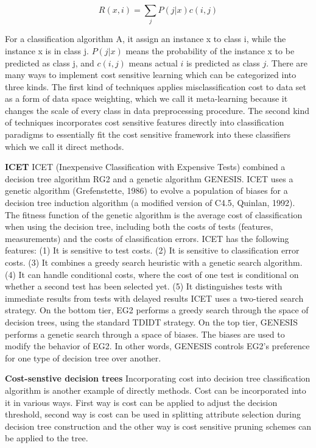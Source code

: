 \begin{equation} R(x,i)=\sum_{j}P(j|x)c(i,j) \end{equation}

For a classification algorithm A, it assign an instance x to class i, while the instance x is in class j. $P(j |x)$ means the probability of the instance x to be predicted as class j, and $ c(i,j)$ means actual $i$ is predicted as class $j$.
There are many ways to implement cost sensitive learning which can be categorized into three kinds. The first kind of techniques applies misclassification cost to data set as a form of data space weighting, which we call it meta-learning because it changes the scale of every class in data preprocessing procedure. The second kind of techniques incorporates cost sensitive features directly into classification paradigms to essentially fit the cost sensitive framework into these classifiers which we call it direct methods.

\textbf{ICET}
ICET  (Inexpensive Classification with Expensive Tests)\cite{ref_A} combined a decision tree algorithm RG2 and a genetic algorithm GENESIS. ICET uses a genetic algorithm (Grefenstette, 1986) to evolve a population of biases for a decision tree induction algorithm (a modified version of C4.5, Quinlan, 1992). The fitness function of the genetic algorithm is the average cost of classification when using the decision tree, including both the costs of tests (features, measurements) and the costs of classification errors. ICET has the following features: (1) It is sensitive to test costs. (2) It is sensitive to classification error costs. (3) It combines a greedy search heuristic with a genetic search algorithm. (4) It can handle conditional costs, where the cost of one test is conditional on whether a second test has been selected yet. (5) It distinguishes tests with immediate results from tests with delayed results
ICET uses a two-tiered search strategy. On the bottom tier, EG2 performs a greedy search through the space of decision trees, using the standard TDIDT strategy. On the top tier, GENESIS performs a genetic search through a space of biases. The biases are used to modify the behavior of EG2. In other words, GENESIS controls EG2’s preference for one type of decision tree over another.

\textbf{Cost-senstive decision trees}
Incorporating cost into decision tree classification algorithm is another example of directly methods. Cost can be incorporated into it in various ways. First way is cost can be applied to adjust the decision threshold, second way is cost can be used in splitting attribute selection during decision tree construction and the other way is cost sensitive pruning schemes can be applied to the tree.


